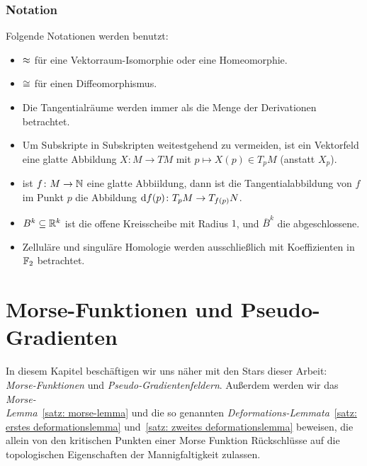 \documentclass[a4paper,11pt,twoside]{scrreport}
\begin{document}
\subsection*{Notation}

Folgende Notationen werden benutzt:

\begin{itemize}
    \item $\approx$ für eine Vektorraum-Isomorphie oder eine Homeomorphie.
    \item $\cong$ für einen Diffeomorphismus.
    \item Die Tangentialräume werden immer als die Menge der Derivationen betrachtet.
    \item Um Subskripte in Subskripten weitestgehend zu vermeiden, ist ein Vektorfeld eine 
        glatte Abbildung $X \colon M \to TM$ mit $p \mapsto X(p) \in T_pM$ (anstatt $X_p$).
    \item ist $f \colon M \to { \mathbb N }$ eine glatte Abbiildung, dann ist die Tangentialabbildung
        von $f$ im Punkt $p$ die Abbildung ${ \operatorname{d} } f (p) \colon T_pM \to T_{f(p)}N$.
    \item $B^k \subseteq { \mathbb R }^k$ ist die offene Kreisscheibe mit Radius $1$, und $\overline{B}^k$
        die abgeschlossene.
    \item Zelluläre und singuläre Homologie werden ausschließlich mit Koeffizienten in ${ \mathbb F }_2$ betrachtet.
\end{itemize}

\tableofcontents

\chapter{Morse-Funktionen und Pseudo-Gradienten}

\makeheaderfancy
\setcounter{page}{1}

In diesem Kapitel beschäftigen wir uns näher mit den Stars dieser Arbeit: \\
\textit{Morse-Funktionen} und \textit{Pseudo-Gradientenfeldern}. Außerdem werden wir das 
\textit{Morse-\\Lemma}~\ref{satz: morse-lemma} und die so genannten 
\textit{Deformations-Lemmata}~\ref{satz: erstes deformationslemma} und~\ref{satz: zweites deformationslemma} 
beweisen, die allein von den kritischen Punkten einer Morse Funktion 
Rückschlüsse auf die topologischen Eigenschaften der Mannigfaltigkeit zulassen.





\end{document}
